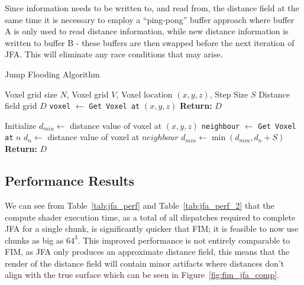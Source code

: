 Since information needs to be written to, and read from, the distance field at the same time it is necessary to employ
a ``ping-pong'' buffer approach where buffer A is only used to read distance information, while new distance information
is written to buffer B - these buffers are then swapped before the next iteration of JFA. This will eliminate any race
conditions that may arise.

\begin{algorithm}[H]
    \caption{Jump Flooding Algorithm}
    \label{alg:jfa}
    \begin{algorithmic}[1]
        \REQUIRE Voxel grid size \(N\), Voxel grid \(V\), Voxel location \((x, y, z)\), Step Size \(S\)
        \ENSURE Distance field grid \(D\)
        \STATE \texttt{voxel} $\gets$ \texttt{Get Voxel at} \((x, y, z)\)
        \STATE \textbf{Return:} \(D\)
        \ENDIF

        \STATE Initialize $d_{min} \gets$ distance value of voxel at \((x, y, z)\)
        \STATE \texttt{neighbour} $\gets$ \texttt{Get Voxel at} $n$
        \STATE $d_{n} \gets$ distance value of voxel at $neighbour$
        \STATE $d_{min} \gets \min(d_{min}, d_n + S)$
        \ENDFOR
        \STATE \textbf{Return:} \(D\)
    \end{algorithmic}
\end{algorithm}

\subsection{Performance Results}
We can see from Table~\ref{tab:jfa_perf} and Table~\ref{tab:jfa_perf_2} that the compute shader execution time, as a
total of all dispatches required to complete JFA for a single chunk, is significantly quicker that FIM; it is feasible
to now use chunks as big as \(64^3\). This improved performance is not entirely comparable to FIM, as JFA only produces
an approximate distance field, this means that the render of the distance field will contain minor artifacts where
distances don't align with the true surface which can be seen in Figure~\ref{fig:fim_jfa_comp}.

